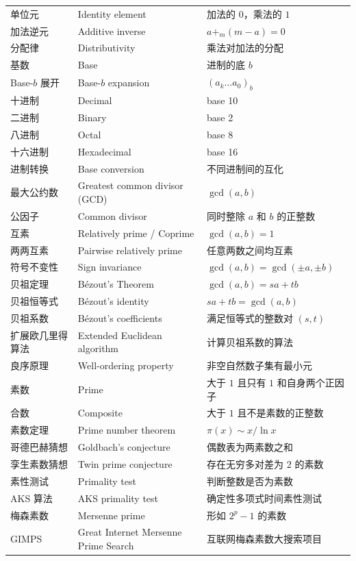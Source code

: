 \documentclass[UTF8,11pt,a4paper]{ctexbook}   %
\theoremstyle{definition}
\begin{document}
\begin{longtable}{|p{4.8cm}|p{4.8cm}|p{4.8cm}|}
单位元 & Identity element & 加法的 $0$，乘法的 $1$ \\
加法逆元 & Additive inverse & $a+_m(m-a)=0$ \\
分配律 & Distributivity & 乘法对加法的分配 \\
基数 & Base & 进制的底 $b$ \\
Base-$b$ 展开 & Base-$b$ expansion & $(a_k\dots a_0)_b$ \\
十进制 & Decimal & base 10 \\
二进制 & Binary & base 2 \\
八进制 & Octal & base 8 \\
十六进制 & Hexadecimal & base 16 \\
进制转换 & Base conversion & 不同进制间的互化 \\
最大公约数 & Greatest common divisor (GCD) & $\gcd(a,b)$ \\
公因子 & Common divisor & 同时整除 $a$ 和 $b$ 的正整数 \\
互素 & Relatively prime / Coprime & $\gcd(a,b)=1$ \\
两两互素 & Pairwise relatively prime & 任意两数之间均互素 \\
符号不变性 & Sign invariance & $\gcd(a,b)=\gcd(\pm a,\pm b)$ \\
\hline
贝祖定理 & Bézout's Theorem & $\gcd(a,b)=sa+tb$ \\
贝祖恒等式 & Bézout's identity & $sa+tb=\gcd(a,b)$ \\
贝祖系数 & Bézout's coefficients & 满足恒等式的整数对 $(s,t)$ \\
扩展欧几里得算法 & Extended Euclidean algorithm & 计算贝祖系数的算法 \\
良序原理 & Well-ordering property & 非空自然数子集有最小元 \\
\hline
素数 & Prime & 大于 $1$ 且只有 $1$ 和自身两个正因子 \\
合数 & Composite & 大于 $1$ 且不是素数的正整数 \\
素数定理 & Prime number theorem & $\pi(x)\sim x/\ln x$ \\
哥德巴赫猜想 & Goldbach's conjecture & 偶数表为两素数之和 \\
孪生素数猜想 & Twin prime conjecture & 存在无穷多对差为 $2$ 的素数 \\
素性测试 & Primality test & 判断整数是否为素数 \\
AKS 算法 & AKS primality test & 确定性多项式时间素性测试 \\
梅森素数 & Mersenne prime & 形如 $2^p-1$ 的素数 \\
GIMPS & Great Internet Mersenne Prime Search & 互联网梅森素数大搜索项目 \\

\end{longtable}
\end{document}
